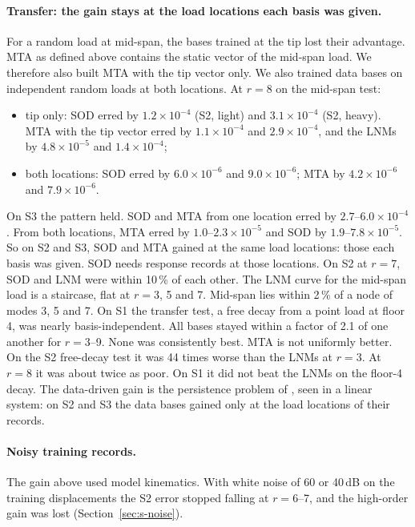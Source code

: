 \documentclass[11pt]{article}
\begin{document}
\paragraph{Transfer: the gain stays at the load locations each basis was given.} For a random load at mid-span, the bases trained at the tip lost their advantage. MTA as defined above contains the static vector of the mid-span load. We therefore also built MTA with the tip vector only. We also trained data bases on independent random loads at both locations. At $r=8$ on the mid-span test:
\begin{itemize}
\item tip only: SOD erred by $1.2\times10^{-4}$ (S2, light) and $3.1\times10^{-4}$ (S2, heavy). MTA with the tip vector erred by $1.1\times10^{-4}$ and $2.9\times10^{-4}$, and the LNMs by $4.8\times10^{-5}$ and $1.4\times10^{-4}$;
\item both locations: SOD erred by $6.0\times10^{-6}$ and $9.0\times10^{-6}$; MTA by $4.2\times10^{-6}$ and $7.9\times10^{-6}$.
\end{itemize}
On S3 the pattern held. SOD and MTA from one location erred by $2.7$--$6.0\times10^{-4}$. From both locations, MTA erred by $1.0$--$2.3\times10^{-5}$ and SOD by $1.9$--$7.8\times10^{-5}$.
So on S2 and S3, SOD and MTA gained at the same load locations: those each basis was given. SOD needs response records at those locations.
On S2 at $r=7$, SOD and LNM were within 10\,\% of each other. The LNM curve for the mid-span load is a staircase, flat at $r=3$, 5 and 7. Mid-span lies within 2\,\% of a node of modes 3, 5 and 7.
On S1 the transfer test, a free decay from a point load at floor 4, was nearly basis-independent. All bases stayed within a factor of 2.1 of one another for $r=3$--9. None was consistently best.
MTA is not uniformly better. On the S2 free-decay test it was 44 times worse than the LNMs at $r=3$. At $r=8$ it was about twice as poor. On S1 it did not beat the LNMs on the floor-4 decay.
The data-driven gain is the persistence problem of \citet{Ilbeigi2017}, seen in a linear system: on S2 and S3 the data bases gained only at the load locations of their records.

\paragraph{Noisy training records.} The gain above used model kinematics. With white noise of 60 or 40\,dB on the training displacements the S2 error stopped falling at $r=6$--7, and the high-order gain was lost (Section~\ref{sec:s-noise}).
\end{document}
